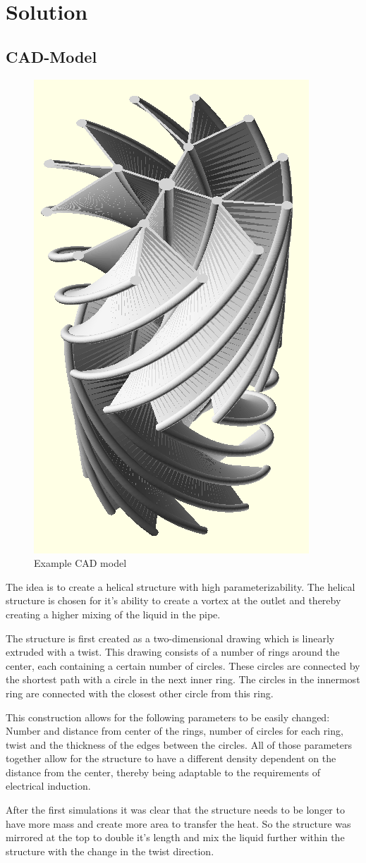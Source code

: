 \documentclass[journal,article,processes,submit,moreauthors,pdftex]{Definitions/mdpi}
\begin{document}
\section{Solution}

\subsection{CAD-Model}

\begin{figure}
\centerline{\includegraphics[height=0.48\textwidth]{./docu_pictures/simple_double_part.png}}
\caption{Example CAD model}
\label{cad-number-of-objects}
\end{figure}

The idea is to create a helical structure with high parameterizability. The helical structure is chosen for it's ability to create a vortex at the outlet and thereby creating a higher mixing of the liquid in the pipe. 

The structure is first created as a two-dimensional drawing which is linearly extruded with a twist. This drawing consists of a number of rings around the center, each containing a certain number of circles. These circles are connected by the shortest path with a circle in the next inner ring. The circles in the innermost ring are connected with the closest other circle from this ring.

This construction allows for the following parameters to be easily changed: Number and distance from center of the rings, number of circles for each ring, twist and the thickness of the edges between the circles. All of those parameters together allow for the structure to have a different density dependent on the distance from the center, thereby being adaptable to the requirements of electrical induction.

After the first simulations it was clear that the structure needs to be longer to have more mass and create more area to transfer the heat. So the structure was mirrored at the top to double it's length and mix the liquid further within the structure with the change in the twist direction.
\end{document}
